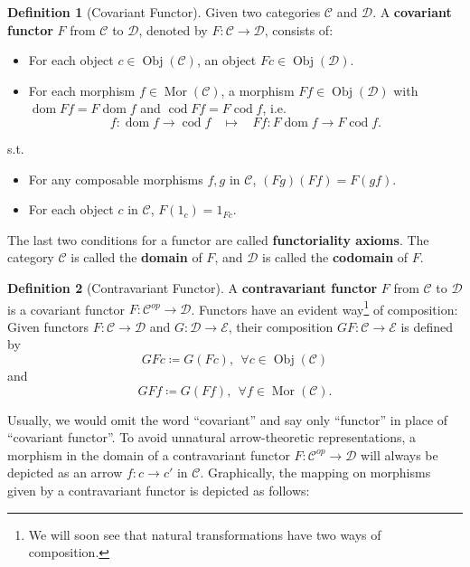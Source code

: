 \documentclass{article}
\theoremstyle{definition}
\newtheorem{definition}{Definition}[section]
\theoremstyle{definition}
\theoremstyle{remark}
\DeclareMathOperator{\Obj}{Obj}
\DeclareMathOperator{\Mor}{Mor}
\DeclareMathOperator{\dom}{dom}
\DeclareMathOperator{\cod}{cod}
\begin{document}
	\begin{definition}[Covariant Functor]
	Given two categories $\mathcal{C}$ and $\mathcal{D}$. A \textbf{covariant functor} $F$ from $\mathcal{C}$ to $\mathcal{D}$, denoted by $F:\mathcal{C}\to \mathcal{D}$, consists of:
	\begin{itemize}
		\item For each object $c\in \Obj(\mathcal{C})$, an object $Fc\in\Obj(\mathcal{D})$.
		\item For each morphism $f\in\Mor(\mathcal{C})$, a morphism $Ff\in\Obj(\mathcal{D})$ with $\dom Ff=F\dom f$ and $\cod Ff=F\cod f$, i.e.
		\[f:\dom f\to \cod f\ \ \ \ \mapsto\ \ \ \ Ff:F\dom f\to F\cod f.\]
	\end{itemize}
	s.t. 
	\begin{itemize}
		\item For any composable morphisms $f,g$ in $\mathcal{C}$, $(Fg)(Ff)=F(gf)$.
		\item For each object $c$ in $\mathcal{C}$, $F(1_c)=1_{Fc}$.
	\end{itemize}
	The last two conditions for a functor are called \textbf{functoriality axioms}. The category $\mathcal{C}$ is called the \textbf{domain} of $F$, and $\mathcal{D}$ is called the \textbf{codomain} of $F$.
	\end{definition}
	\begin{definition}[Contravariant Functor]
	A \textbf{contravariant functor} $F$ from $\mathcal{C}$ to $\mathcal{D}$ is a covariant functor $F:\mathcal{C}^{op}\to \mathcal{D}$. Functors have an evident way\footnote{We will soon see that natural transformations have two ways of composition.} of composition: Given functors $F:\mathcal{C}\to \mathcal{D}$ and $G:\mathcal{D}\to \mathcal{E}$, their composition $GF:\mathcal{C}\to \mathcal{E}$ is defined by
	\[GFc\coloneqq G(Fc),\ \ \forall c\in\Obj(\mathcal{C})\]
	and
	\[GFf\coloneqq G(Ff),\ \ \forall f\in\Mor(\mathcal{C}).\]
	\end{definition}
	Usually, we would omit the word ``covariant'' and say only ``functor'' in place of ``covariant functor''. To avoid unnatural arrow-theoretic representations, a morphism in the domain of a contravariant functor $F:\mathcal{C}^{op}\to \mathcal{D}$ will always be depicted as an arrow $f:c\to c'$ in $\mathcal{C}$. Graphically, the mapping on morphisms given by a contravariant functor is depicted as follows:
	\begin{center}
	\end{center}
\end{document}
